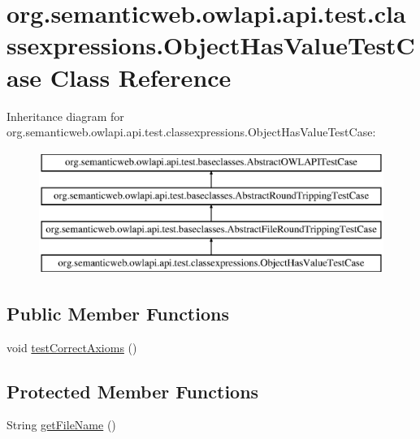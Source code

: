 \hypertarget{classorg_1_1semanticweb_1_1owlapi_1_1api_1_1test_1_1classexpressions_1_1_object_has_value_test_case}{\section{org.\-semanticweb.\-owlapi.\-api.\-test.\-classexpressions.\-Object\-Has\-Value\-Test\-Case Class Reference}
\label{classorg_1_1semanticweb_1_1owlapi_1_1api_1_1test_1_1classexpressions_1_1_object_has_value_test_case}
}
Inheritance diagram for org.\-semanticweb.\-owlapi.\-api.\-test.\-classexpressions.\-Object\-Has\-Value\-Test\-Case\-:\begin{figure}[H]
\begin{center}
\leavevmode
\includegraphics[height=4.000000cm]{classorg_1_1semanticweb_1_1owlapi_1_1api_1_1test_1_1classexpressions_1_1_object_has_value_test_case}
\end{center}
\end{figure}
\subsection*{Public Member Functions}
\begin{DoxyCompactItemize}
\item 
void \hyperlink{classorg_1_1semanticweb_1_1owlapi_1_1api_1_1test_1_1classexpressions_1_1_object_has_value_test_case_a4910e8ee3e19e59d048e76541aa6fb21}{test\-Correct\-Axioms} ()
\end{DoxyCompactItemize}
\subsection*{Protected Member Functions}
\begin{DoxyCompactItemize}
\item 
String \hyperlink{classorg_1_1semanticweb_1_1owlapi_1_1api_1_1test_1_1classexpressions_1_1_object_has_value_test_case_ad3c981281474ac9749ef470ab2b4d688}{get\-File\-Name} ()
\end{DoxyCompactItemize}


